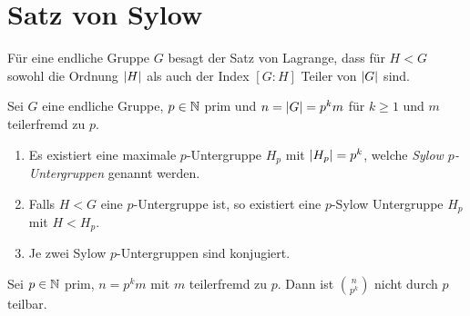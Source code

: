 \section{Satz von Sylow}
Für eine endliche Gruppe $G$ besagt der Satz von Lagrange, dass für $H < G$ sowohl die Ordnung $\abs{H}$ als auch der Index $[G:H]$ Teiler von  $\abs{G}$ sind.

\begin{theorem}[Sylow]
	Sei $G$ eine endliche Gruppe, $p \in \mathbb{N}$ prim und $n = \abs{G} = p^{k} m$ für $k \geq 1$ und $m$ teilerfremd zu $p$.
	\begin{enumerate}[1)]
		\item Es existiert eine maximale $p$-Untergruppe $H_{p}$ mit $\abs{H_{p}} = p^{k}$, welche \emph{Sylow $p$-Untergruppen} genannt werden.
		\item Falls $H < G$ eine $p$-Untergruppe ist, so existiert eine $p$-Sylow Untergruppe $H_{p}$ mit $H < H_{p}$.
		\item Je zwei Sylow $p$-Untergruppen sind konjugiert.
	\end{enumerate}
\end{theorem}

\begin{lemma}
	Sei $p \in \mathbb{N}$ prim, $n = p^{k}m$ mit $m$ teilerfremd zu $p$.
	Dann ist $\binom{n}{p^{k}}$ nicht durch $p$ teilbar.
\end{lemma}

